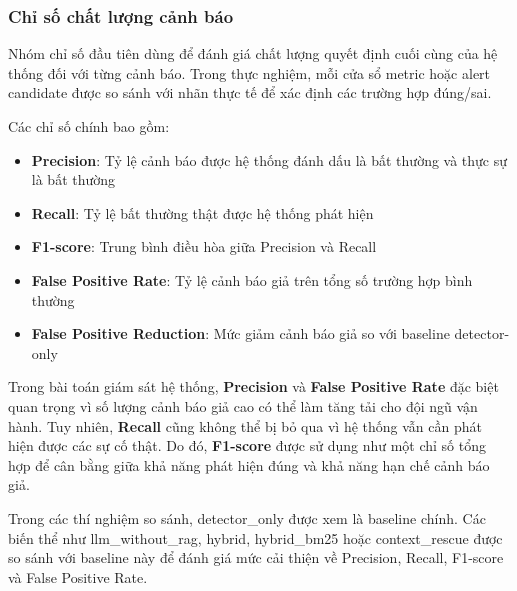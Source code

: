 \subsubsection{Chỉ số chất lượng cảnh báo}
Nhóm chỉ số đầu tiên dùng để đánh giá chất lượng quyết định cuối cùng của hệ thống đối với từng cảnh báo. Trong thực nghiệm, mỗi cửa sổ metric hoặc alert candidate được so sánh với nhãn thực tế để xác định các trường hợp đúng/sai.

Các chỉ số chính bao gồm:
\begin{itemize}[label=--]
    \item \textbf{Precision}: Tỷ lệ cảnh báo được hệ thống đánh dấu là bất thường và thực sự là bất thường
    \item \textbf{Recall}: Tỷ lệ bất thường thật được hệ thống phát hiện
    \item \textbf{F1-score}: Trung bình điều hòa giữa Precision và Recall
    \item \textbf{False Positive Rate}: Tỷ lệ cảnh báo giả trên tổng số trường hợp bình thường
    \item \textbf{False Positive Reduction}: Mức giảm cảnh báo giả so với baseline detector-only
\end{itemize}
Trong bài toán giám sát hệ thống, \textbf{Precision} và \textbf{False Positive Rate} đặc biệt quan trọng vì số lượng cảnh báo giả cao có thể làm tăng tải cho đội ngũ vận hành. Tuy nhiên, \textbf{Recall} cũng không thể bị bỏ qua vì hệ thống vẫn cần phát hiện được các sự cố thật. Do đó, \textbf{F1-score} được sử dụng như một chỉ số tổng hợp để cân bằng giữa khả năng phát hiện đúng và khả năng hạn chế cảnh báo giả.

Trong các thí nghiệm so sánh, detector\_only được xem là baseline chính. Các biến thể như llm\_without\_rag, hybrid, hybrid\_bm25 hoặc context\_rescue được so sánh với baseline này để đánh giá mức cải thiện về Precision, Recall, F1-score và False Positive Rate.
